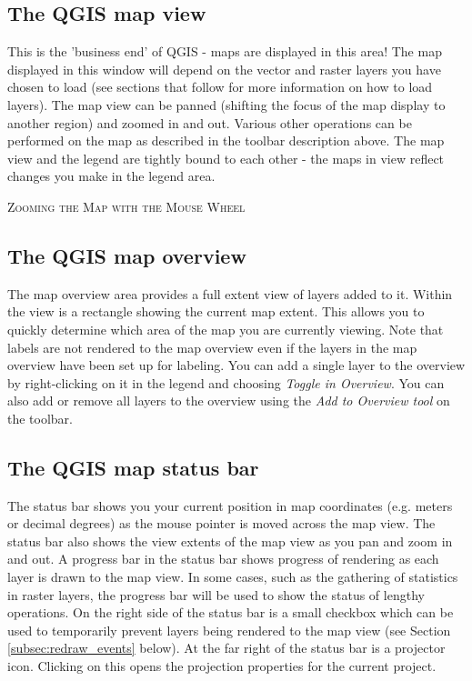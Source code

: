 \subsection{The QGIS map view}
This is the 'business end' of QGIS - maps are displayed in this area! The map
displayed in this window will depend on the vector and raster layers you have
chosen to load (see sections that follow for more information on how to load layers).
The map view can be panned (shifting the focus of the map display to another
region) and zoomed in and out. Various other operations can be performed on
the map as described in the toolbar description above.  The map view and the
legend are tightly bound to each other - the maps in view reflect changes you
make in the legend area.  
\begin{Tip}\caption{\textsc{Zooming the Map with the Mouse
Wheel}}
\end{Tip}
\subsection{The QGIS map overview}
The map overview area provides a full extent view of layers added to it.
Within the view is a rectangle showing the current map extent. This allows you
to quickly determine which area of the map you are currently viewing. Note
that labels are not rendered to the map overview even if the layers in the map
overview have been set up for labeling. You can add a single layer to the
overview by right-clicking on it in the legend and choosing \textit{Toggle in
Overview}. You can also add or remove all layers to the overview using the
\textit{Add to Overview tool} on the toolbar.

\subsection{The QGIS map status bar} 
The status bar shows you your current position in map coordinates (e.g. meters
or decimal degrees) as the mouse pointer is moved across the map view. The
status bar also shows the view extents of the map view as you pan and zoom in
and out. A progress bar in the status bar shows progress of rendering as each
layer is drawn to the map view. In some cases, such as the gathering of
statistics in raster layers, the progress bar will be used to show the status
of lengthy operations. On the right side of the status bar is a small checkbox which
can be used to temporarily prevent layers being rendered to the map view (see
Section \ref{subsec:redraw_events} below). At the far right of the status bar
is a projector icon. Clicking on this opens the projection properties for the
current project.

